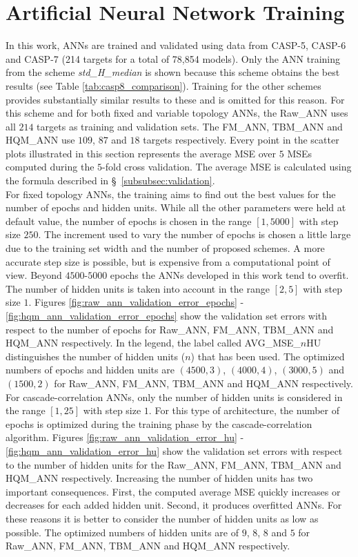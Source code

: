 \section{Artificial Neural Network Training}
\label{sec:ann_training}
In this work, ANNs are trained and validated using data from CASP-5, CASP-6 and CASP-7 (214 targets for a total of 78,854 models). Only the ANN training from the scheme \emph{std\_H\_median} is shown because this scheme obtains the best results (see Table \ref{tab:casp8_comparison}). Training for the other schemes provides substantially similar results to these and is omitted for this reason. For this scheme and for both fixed and variable topology ANNs, the Raw\_ANN uses all $214$ targets as training and validation sets. The FM\_ANN, TBM\_ANN and HQM\_ANN use $109$, $87$ and $18$ targets respectively. Every point in the scatter plots illustrated in this section represents the average MSE over $5$ MSEs computed during the $5$-fold cross validation. The average MSE is calculated using the formula described in \S~\ref{subsubsec:validation}. \\
For fixed topology ANNs, the training aims to find out the best values for the number of epochs and hidden units. While all the other parameters were held at default value, the number of epochs is chosen in the range $[1, 5000]$ with step size $250$. The increment used to vary the number of epochs is chosen a little large due to the training set width and the number of proposed schemes. A more accurate step size is possible, but is expensive from a computational point of view. Beyond $4500$-$5000$ epochs the ANNs developed in this work tend to overfit. The number of hidden units is taken into account in the range $[2, 5]$ with step size $1$. Figures \ref{fig:raw_ann_validation_error_epochs} - \ref{fig:hqm_ann_validation_error_epochs} show the validation set errors with respect to the number of epochs for Raw\_ANN, FM\_ANN, TBM\_ANN and HQM\_ANN respectively. In the legend, the label called AVG\_MSE\_$n$HU distinguishes the number of hidden units ($n$) that has been used. 
The optimized numbers of epochs and hidden units are $(4500, 3)$, $(4000, 4)$, $(3000, 5)$ and $(1500, 2)$ for Raw\_ANN, FM\_ANN, TBM\_ANN and HQM\_ANN respectively.\\
For ca\-sca\-de-\-cor\-re\-la\-tion ANNs, only the number of hidden units is considered in the range $[1, 25]$ with step size $1$. For this type of architecture, the number of epochs is optimized during the training phase by the ca\-sca\-de-\-cor\-re\-la\-tion algorithm. Figures \ref{fig:raw_ann_validation_error_hu} - \ref{fig:hqm_ann_validation_error_hu} show the validation set errors with respect to the number of hidden units for the Raw\_ANN, FM\_ANN, TBM\_ANN and HQM\_ANN respectively. Increasing the number of hidden units has two important consequences. First, the computed average MSE quickly increases or decreases for each added hidden unit. Second, it produces overfitted ANNs. For these reasons it is better to consider the number of hidden units as low as possible. The optimized numbers of hidden units are of $9$, $8$, $8$ and $5$ for Raw\_ANN, FM\_ANN, TBM\_ANN and HQM\_ANN respectively.

